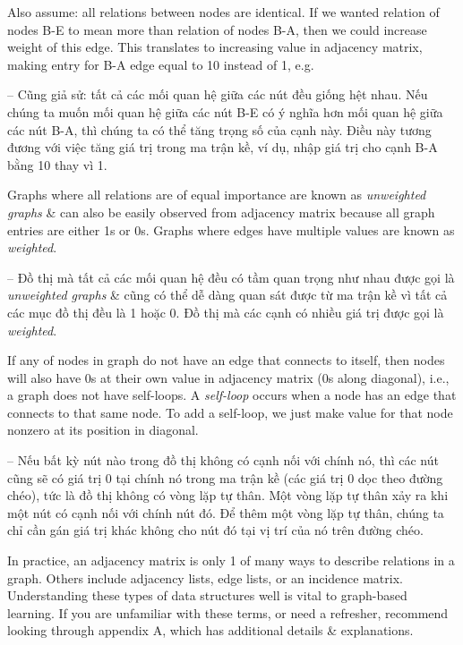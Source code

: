 \documentclass{article}
\begin{document}
\begin{itemize}
\begin{itemize}
\begin{itemize}
            Also assume: all relations between nodes are identical. If we wanted relation of nodes B-E to mean more than relation of nodes B-A, then we could increase weight of this edge. This translates to increasing value in adjacency matrix, making entry for B-A edge equal to 10 instead of 1, e.g.

            -- Cũng giả sử: tất cả các mối quan hệ giữa các nút đều giống hệt nhau. Nếu chúng ta muốn mối quan hệ giữa các nút B-E có ý nghĩa hơn mối quan hệ giữa các nút B-A, thì chúng ta có thể tăng trọng số của cạnh này. Điều này tương đương với việc tăng giá trị trong ma trận kề, ví dụ, nhập giá trị cho cạnh B-A bằng 10 thay vì 1.

            Graphs where all relations are of equal importance are known as {\it unweighted graphs} \& can also be easily observed from adjacency matrix because all graph entries are either 1s or 0s. Graphs where edges have multiple values are known as {\it weighted}.

            -- Đồ thị mà tất cả các mối quan hệ đều có tầm quan trọng như nhau được gọi là {\it unweighted graphs} \& cũng có thể dễ dàng quan sát được từ ma trận kề vì tất cả các mục đồ thị đều là 1 hoặc 0. Đồ thị mà các cạnh có nhiều giá trị được gọi là {\it weighted}.

            If any of nodes in graph do not have an edge that connects to itself, then nodes will also have 0s at their own value in adjacency matrix (0s along diagonal), i.e., a graph does not have self-loops. A {\it self-loop} occurs when a node has an edge that connects to that same node. To add a self-loop, we just make value for that node nonzero at its position in diagonal.

            -- Nếu bất kỳ nút nào trong đồ thị không có cạnh nối với chính nó, thì các nút cũng sẽ có giá trị 0 tại chính nó trong ma trận kề (các giá trị 0 dọc theo đường chéo), tức là đồ thị không có vòng lặp tự thân. Một vòng lặp tự thân {\it} xảy ra khi một nút có cạnh nối với chính nút đó. Để thêm một vòng lặp tự thân, chúng ta chỉ cần gán giá trị khác không cho nút đó tại vị trí của nó trên đường chéo.

            In practice, an adjacency matrix is only 1 of many ways to describe relations in a graph. Others include adjacency lists, edge lists, or an incidence matrix. Understanding these types of data structures well is vital to graph-based learning. If you are unfamiliar with these terms, or need a refresher, recommend looking through appendix A, which has additional details \& explanations.


\end{itemize}
\end{itemize}
\end{itemize}
\end{document}
